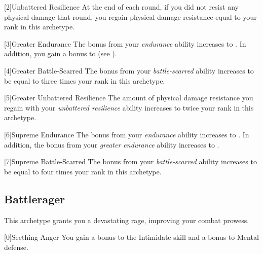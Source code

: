         [2]{Unbattered Resilience} At the end of each round, if you did not resist any physical damage that round, you regain physical damage resistance equal to your rank in this archetype.

        [3]{Greater Endurance} The bonus from your \textit{endurance} ability increases to .
        In addition, you gain a  bonus to  (see ).

        [4]{Greater Battle-Scarred} The bonus from your \textit{battle-scarred} ability increases to be equal to three times your rank in this archetype.

        [5]{Greater Unbattered Resilience} The amount of physical damage resistance you regain with your \textit{unbattered resilience} ability increases to twice your rank in this archetype.

        [6]{Supreme Endurance} The bonus from your \textit{endurance} ability increases to .
        In addition, the bonus from your \textit{greater endurance} ability increases to .

        [7]{Supreme Battle-Scarred} The bonus from your \textit{battle-scarred} ability increases to be equal to four times your rank in this archetype.

    \newpage
    \subsection{Battlerager}\label{Rage}
        This archetype grants you a devastating rage, improving your combat prowess.

        [0]{Seething Anger} You gain a  bonus to the Intimidate skill and a  bonus to Mental defense.

